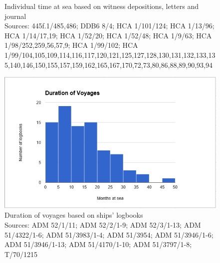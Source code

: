 \begin{figure}
\caption{\label{fig:key:4.2} Individual time at sea based on witness depositions, letters and journal\\
{\tiny Sources: 445f.1/485,486; DDB6 8/4; HCA 1/101/124; HCA 1/13/96; HCA 1/14/17,19; HCA 1/52/20; HCA 1/52/48; HCA 1/9/63; HCA 1/98/252,259,56,57,9; HCA 1/99/102; HCA 1/99/104,105,109,114,116,117,120,121,125,127,128,130,131,132,133,135,140,146,150,155,157,159,162,165,167,170,72,73,80,86,88,89,90,93,94}
}
\end{figure}


\begin{figure}
  

\includegraphics[width=\textwidth]{figures/delgado-img10.png}


\caption{\label{fig:key:4.3} Duration of voyages based on ships’ logbooks\\
{\tiny Sources: ADM 52/1/11; ADM 52/2/1-9; ADM 52/3/1-13; ADM 51/4322/1-6; ADM 51/3983/1-4; ADM 51/3954; ADM 51/3946/1-6; ADM 51/3946/1-13; ADM 51/4170/1-10; ADM 51/3797/1-8; T/70/1215}
}
\end{figure}


